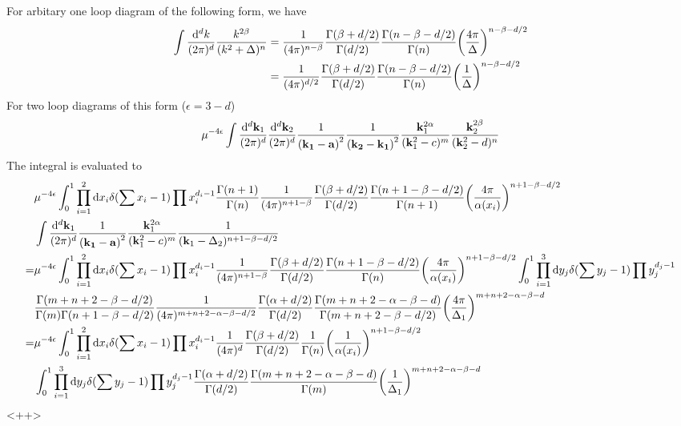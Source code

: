 \documentclass{article}
\newcommand{\vbk}{\vb{k}}
\renewcommand{\a}{\alpha}
\renewcommand{\b}{\beta}
\begin{document}
\begin{appendices}
  For arbitary one loop diagram of the following form, we have
  \begin{subequations} \label{1loopgamma}
	\begin{align}
	  \int\frac{\dd^dk}{(2\pi)^d}\frac{k^{2\b}}{(k^2+\Delta)^n}&=\frac{1}{(4\pi)^{n-\b}}\frac{\Gamma(\b+d/2)}{\Gamma(d/2)}\frac{\Gamma(n-\b-d/2)}{\Gamma(n)}\pqty{\frac{4\pi}{\Delta}}^{n-\b-d/2}\\
	  &=\frac{1}{(4\pi)^{d/2}}\frac{\Gamma(\b+d/2)}{\Gamma(d/2)}\frac{\Gamma(n-\b-d/2)}{\Gamma(n)}\pqty{\frac{1}{\Delta}}^{n-\b-d/2}
	\end{align}
  \end{subequations}
  For two loop diagrams of this form ($\epsilon=3-d$)
  \begin{align}
	\mu^{-4\epsilon}\int\frac{\dd^d\vb{k}_1}{(2\pi)^d}\frac{\dd^d\vb{k}_2}{(2\pi)^d}\frac{1}{\vb{(k_1-a)}^2}\frac{1}{\vb{(k_2-k_1)}^2}\frac{\vbk_1^{2\a}}{(\vb{k}_1^2-c)^m}\frac{\vbk_2^{2\b}}{(\vb{k}_2^2-d)^n}
	\label{int}
  \end{align}
  The integral is evaluated to
  \begin{align*}
	&\mu^{-4\epsilon}\int_0^1\prod_{i=1}^2\dd x_i\delta(\sum x_i-1)\prod x_i^{d_i-1}\frac{\Gamma(n+1)}{\Gamma(n)}\frac{1}{(4\pi)^{n+1-\b}}\frac{\Gamma(\b+d/2)}{\Gamma(d/2)}\frac{\Gamma(n+1-\b-d/2)}{\Gamma(n+1)}\pqty{\frac{4\pi}{\a(x_i)}}^{n+1-\b-d/2}
	\\&\int\frac{\dd^d\vb{k}_1}{(2\pi)^d}\frac{1}{\vb{(k_1-a)}^2}\frac{\vbk_1^{2\a}}{(\vb{k}_1^2-c)^m}\frac{1}{(\vb{k}_1-\Delta_2)^{n+1-\b-d/2}}\\
	=&\mu^{-4\epsilon}\int_0^1\prod_{i=1}^2\dd x_i\delta(\sum x_i-1)\prod x_i^{d_i-1}\frac{1}{(4\pi)^{n+1-\b}}\frac{\Gamma(\b+d/2)}{\Gamma(d/2)}\frac{\Gamma(n+1-\b-d/2)}{\Gamma(n)}\pqty{\frac{4\pi}{\a(x_i)}}^{n+1-\b-d/2}\int_0^1\prod_{i=1}^3\dd y_j\delta(\sum y_j-1)\prod y_j^{d_j-1}
	\\&\frac{\Gamma(m+n+2-\b-d/2)}{\Gamma(m)\Gamma(n+1-\b-d/2)}\frac{1}{(4\pi)^{m+n+2-\a-\b-d/2}}\frac{\Gamma(\a+d/2)}{\Gamma(d/2)}\frac{\Gamma(m+n+2-\a-\b-d)}{\Gamma(m+n+2-\b-d/2)}\pqty{\frac{4\pi}{\Delta_1}}^{m+n+2-\a-\b-d}
	\\
	=&\mu^{-4\epsilon}\int_0^1\prod_{i=1}^2\dd x_i\delta(\sum x_i-1)\prod x_i^{d_i-1}\frac{1}{(4\pi)^{d}}\frac{\Gamma(\b+d/2)}{\Gamma(d/2)}\frac{1}{\Gamma(n)}\pqty{\frac{1}{\a(x_i)}}^{n+1-\b-d/2}
	\\&\int_0^1\prod_{i=1}^3\dd y_j\delta(\sum y_j-1)\prod y_j^{d_j-1}\frac{\Gamma(\a+d/2)}{\Gamma(d/2)}\frac{\Gamma(m+n+2-\a-\b-d)}{\Gamma(m)}\pqty{\frac{1}{\Delta_1}}^{m+n+2-\a-\b-d}
  \end{align*}<++>
\end{appendices}
\end{document}
